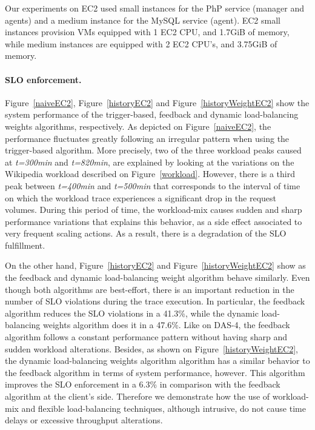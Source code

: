 Our experiments on EC2 used small instances for the PhP service (manager and agents) and  a medium instance for the MySQL service (agent). EC2 small instances provision VMs equipped with 1 EC2 CPU, and 1.7GiB of memory, while medium instances are equipped with 2 EC2 CPU's, and 3.75GiB of memory.


\paragraph{SLO enforcement.}
Figure~\ref{naiveEC2}, Figure~\ref{historyEC2} and Figure~\ref{historyWeightEC2} show the system performance of the trigger-based, feedback and dynamic load-balancing weights algorithms, respectively. As depicted on Figure~\ref{naiveEC2}, the performance fluctuates greatly following an irregular pattern when using the trigger-based algorithm. More precisely, two of the three workload peaks caused at \emph{t=300min} and \emph{t=820min}, are explained by looking at the variations on the Wikipedia workload described on Figure~\ref{workload}. However, there is a third peak between \emph{t=400min} and \emph{t=500min} that corresponds to the interval of time on which the workload trace experiences a significant drop in the request volumes. During this period of time, the workload-mix causes sudden and sharp performance variations that explains this behavior, as a side effect associated to very frequent scaling actions. As a result, there is a degradation of the SLO fulfillment. 

On the other hand, Figure~\ref{historyEC2} and Figure~\ref{historyWeightEC2} show as the feedback and dynamic load-balancing weight algorithm behave similarly. Even though both algorithms are best-effort, there is an important reduction in the number of SLO violations during the trace execution. In particular, the feedback algorithm reduces the SLO violations in a  41.3\%, while the dynamic load-balancing weights algorithm does it in a 47.6\%. Like on DAS-4, the feedback algorithm follows a constant performance pattern without having sharp and sudden workload alterations. Besides, as shown on Figure~\ref{historyWeightEC2}, the dynamic load-balancing weights algorithm algorithm has a similar behavior to the feedback algorithm in terms of system performance, however. This algorithm improves the SLO enforcement in a 6.3\% in comparison with the feedback algorithm at the client's side. Therefore we demonstrate how the use of workload-mix and flexible load-balancing techniques, although intrusive, do not cause time delays or excessive throughput alterations. 



